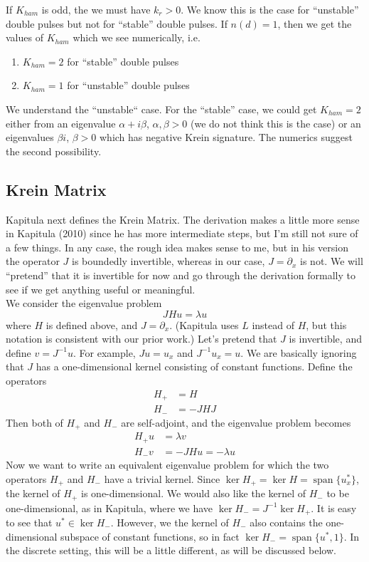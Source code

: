 \documentclass[12pt]{article}
\DeclareMathOperator{\spn}{span}
\begin{document}
If $K_{ham}$ is odd, the we must have $k_r > 0$. We know this is the case for ``unstable'' double pulses but not for ``stable'' double pulses. If $n(d) = 1$, then we get the values of $K_{ham}$ which we see numerically, i.e.

\begin{enumerate}
	\item $K_{ham} = 2$ for ``stable'' double pulses
	\item $K_{ham} = 1$ for ``unstable'' double pulses
\end{enumerate}

We understand the ``unstable`` case. For the ``stable'' case, we could get $K_{ham} = 2$ either from an eigenvalue $\alpha + i \beta$, $\alpha, \beta > 0$ (we do not think this is the case) or an eigenvalues $\beta i$, $\beta > 0$ which has negative Krein signature. The numerics suggest the second possibility.

\subsection{Krein Matrix}

Kapitula next defines the Krein Matrix. The derivation makes a little more sense in Kapitula (2010) since he has more intermediate steps, but I'm still not sure of a few things. In any case, the rough idea makes sense to me, but in his version the operator $J$ is boundedly invertible, whereas in our case, $J = \partial_x$ is not. We will ``pretend'' that it is invertible for now and go through the derivation formally to see if we get anything useful or meaningful.\\

We consider the eigenvalue problem
\[
J H u = \lambda u
\]
where $H$ is defined above, and $J = \partial_x$. (Kapitula uses $L$ instead of $H$, but this notation is consistent with our prior work.) Let's pretend that $J$ is invertible, and define $v = J^{-1}u$. For example, $Ju = u_x$ and $J^{-1}u_x = u$. We are basically ignoring that $J$ has a one-dimensional kernel consisting of constant functions. Define the operators
\begin{align}
H_+ &= H \\
H_- &= -JHJ
\end{align}
Then both of $H_+$ and $H_-$ are self-adjoint, and the eigenvalue problem becomes
\begin{align}
H_+ u &= \lambda v \\
H_- v &= -JHu = -\lambda u
\end{align}
Now we want to write an equivalent eigenvalue problem for which the two operators $H_+$ and $H_-$ have a trivial kernel. Since $\ker H_+ = \ker H = \spn \{u^*_x\}$, the kernel of $H_+$ is one-dimensional. We would also like the kernel of $H_-$ to be one-dimensional, as in Kapitula, where we have $\ker H_- = J^{-1} \ker H_+$. It is easy to see that $u^* \in \ker H_-$. However, we the kernel of $H_-$ also contains the one-dimensional subspace of constant functions, so in fact $\ker H_- = \spn \{u^*, 1\}$. In the discrete setting, this will be a little different, as will be discussed below.\\
\end{document}
